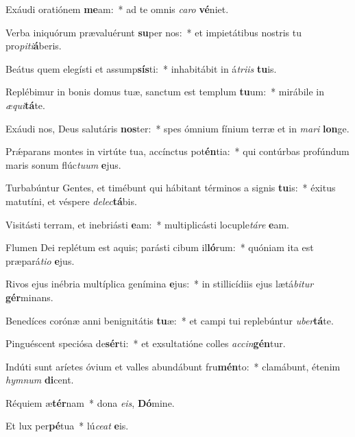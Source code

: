 \item Exáudi oratiónem \textbf{me}am:~* ad te omnis \textit{ca}\textit{ro} \textbf{vé}niet.

\item Verba iniquórum prævaluérunt \textbf{su}per nos:~* et impietátibus nostris tu pro\textit{pi}\textit{ti}\textbf{á}beris.

\item Beátus quem elegísti et assump\textbf{sís}ti:~* inhabitábit in á\textit{tri}\textit{is} \textbf{tu}is.

\item Replébimur in bonis domus tuæ, sanctum est templum \textbf{tu}um:~* mirábile in \textit{æ}\textit{qui}\textbf{tá}te.

\item Exáudi nos, Deus salutáris \textbf{nos}ter:~* spes ómnium fínium terræ et in \textit{ma}\textit{ri} \textbf{lon}ge.

\item Prǽparans montes in virtúte tua, accínctus pot\textbf{én}tia:~* qui contúrbas profúndum maris sonum flúc\textit{tu}\textit{um} \textbf{e}jus.

\item Turbabúntur Gentes, et timébunt qui hábitant términos a signis \textbf{tu}is:~* éxitus matutíni, et véspere \textit{de}\textit{lec}\textbf{tá}bis.

\item Visitásti terram, et inebriásti \textbf{e}am:~* multiplicásti locuple\textit{tá}\textit{re} \textbf{e}am.

\item Flumen Dei replétum est aquis; parásti cibum il\textbf{ló}rum:~* quóniam ita est præpará\textit{ti}\textit{o} \textbf{e}jus.

\item Rivos ejus inébria multíplica genímina \textbf{e}jus:~* in stillicídiis ejus lætá\textit{bi}\textit{tur} \textbf{gér}minans.

\item Benedíces corónæ anni benignitátis \textbf{tu}æ:~* et campi tui replebúntur \textit{u}\textit{ber}\textbf{tá}te.

\item Pinguéscent speciósa de\textbf{sér}ti:~* et exsultatióne colles \textit{ac}\textit{cin}\textbf{gén}tur.

\item Indúti sunt aríetes óvium et valles abundábunt fru\textbf{mén}to:~* clamábunt, étenim \textit{hym}\textit{num} \textbf{di}cent.

\item Réquiem æ\textbf{tér}nam~* dona \textit{e}\textit{is}, \textbf{Dó}mine.

\item Et lux per\textbf{pé}tua~* lú\textit{ce}\textit{at} \textbf{e}is.
